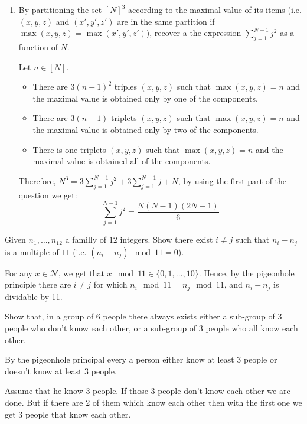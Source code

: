 \documentclass[a4paper,11pt]{exam}
\newcommand{\N}{\mathcal N}
\begin{document}
\begin{questions}
\begin{enumerate}
			\item By partitioning the set $[N]^3$ according to the maximal value of its items (i.e. $ (x,y,z)$ and  $ (x',y',z') $ are in the same partition if $\max(x,y,z) = \max(x',y',z')$), recover a the expression $\sum_{j=1}^{N-1}j^2$ as a function of $N$.
			
			\begin{solution}
				Let $n \in [N]$.
				\begin{itemize}
					\item There are $3(n-1)^2$ triples $(x, y, z)$ such that
					$\max(x, y, z) = n$ and the maximal value is obtained only by one of the components.
					\item There are $3(n-1)$ triplets $(x, y, z)$ such that
					$\max(x, y, z) = n$ and the maximal value is obtained only by two of the components.
					\item There is one triplets $(x, y, z)$ such that
					$\max(x, y, z) = n$ and the maximal value is obtained all of the components.
				\end{itemize}
				Therefore, $N^3 = 3 \sum_{j=1}^{N-1}j^2 + 3 \sum_{j=1}^{N-1}j + N$, 
				by using the first part of the question we get: 
				\[
				\sum_{j=1}^{N-1}j^2 = \frac{N(N-1)(2N-1)}{6}
				\]
			\end{solution}
		\end{enumerate}
		
		\question
		Given $n_1, \dots, n_{12}$ a familly of $12$ integers.
		Show there exist $i \neq j$ such that $n_i - n_j$ is a multiple of $11$ (i.e.  $(n_i - n_j)\mod11 = 0$).
		
		\begin{solution}
			For any $x\in \N$, we get that $x\mod 11\in\{0,1,\ldots,10\}$. Hence, by the pigeonhole principle there are $i\neq j$ for which $n_i\mod 11=n_j\mod 11$, and $n_i-n_j$ is dividable by 11.
		\end{solution}
		
		\question
		Show that, in a group of 6 people there always exists either a sub-group of 3 people who don't know each other, or a sub-group of 3 people who all know each other.
		
		\begin{solution}
			By the pigeonhole principal every a person either know at least 3 people or doesn't know at least 3 people. 
			
			Assume that he know 3 people. If those 3 people don't know each other we are done. But if there are 2 of them which know each other then with the first one we get 3 people that know each other. 
			

\end{solution}
\end{questions}
\end{document}
